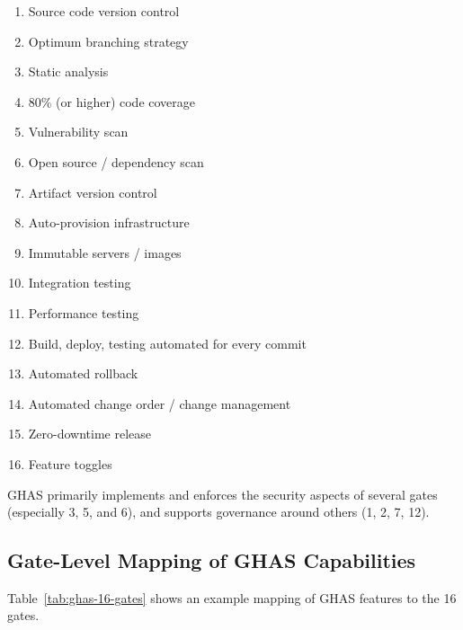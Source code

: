 \documentclass[11pt]{article}
\begin{document}
\begin{enumerate}[leftmargin=*]
  \item Source code version control
  \item Optimum branching strategy
  \item Static analysis
  \item 80\% (or higher) code coverage
  \item Vulnerability scan
  \item Open source / dependency scan
  \item Artifact version control
  \item Auto-provision infrastructure
  \item Immutable servers / images
  \item Integration testing
  \item Performance testing
  \item Build, deploy, testing automated for every commit
  \item Automated rollback
  \item Automated change order / change management
  \item Zero-downtime release
  \item Feature toggles
\end{enumerate}

GHAS primarily implements and enforces the security aspects of several gates (especially 3, 5, and 6), and supports governance around others (1, 2, 7, 12).

\subsection{Gate-Level Mapping of GHAS Capabilities}

Table~\ref{tab:ghas-16-gates} shows an example mapping of GHAS features to the 16 gates.
\end{document}

